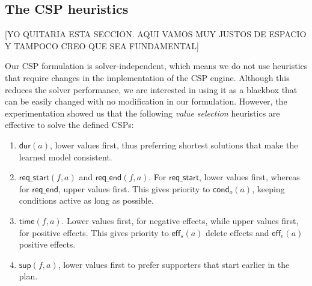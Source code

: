 \documentclass{ecai}
\newcommand{\eff}{\mathsf{eff}}    %
\newcommand{\cond}{\mathsf{cond}}  %
\newcommand{\dur}{\mathsf{dur}}    %
\newcommand{\start}{\mathsf{start}}%
\newcommand{\en}{\mathsf{end}}     %
\newcommand{\supp}{\mathsf{sup}}   %
\newcommand{\tim}{\mathsf{time}}   %
\newcommand{\reqs}{\mathsf{req\_{start}}} %
\newcommand{\reqe}{\mathsf{req\_{end}}}   %
\begin{document}





\subsection{The CSP heuristics}
\label{sec:implementation}

[YO QUITARIA ESTA SECCION. AQUI VAMOS MUY JUSTOS DE ESPACIO Y TAMPOCO CREO QUE SEA FUNDAMENTAL]


Our CSP formulation is solver-independent, which means we do not use heuristics that require changes in the implementation of the CSP engine. Although this reduces the solver performance, we are interested in using it as a blackbox that can be easily changed with no modification in our formulation. However, the experimentation showed us that the following {\em value selection} heuristics are effective to solve the defined CSPs:

\begin{enumerate}
	\item $\dur(a)$, lower values first, thus preferring shortest solutions that make the learned model consistent.
	
	\item $\reqs(f,a)$ and $\reqe(f,a)$. For $\reqs$, lower values first, whereas for $\reqe$, upper values first. This gives priority to $\cond_o(a)$, keeping conditions active as long as possible.  
	
	\item $\tim(f,a)$. Lower values first, for negative effects, while upper values first, for positive effects. This gives priority to $\eff_s(a)$ delete effects and $\eff_e(a)$ positive effects. 
	
	\item $\supp(f,a)$, lower values first to prefer supporters that start earlier in the plan.
\end{enumerate}
\end{document}
